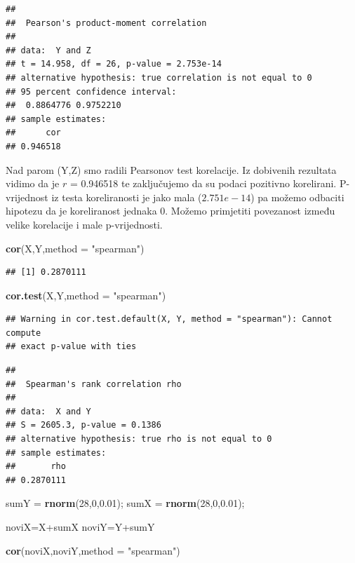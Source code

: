 \documentclass[]{article}
\newenvironment{Shaded}{\begin{snugshade}}{\end{snugshade}}
\newcommand{\KeywordTok}[1]{\textcolor[rgb]{0.13,0.29,0.53}{\textbf{{#1}}}}
\newcommand{\DataTypeTok}[1]{\textcolor[rgb]{0.13,0.29,0.53}{{#1}}}
\newcommand{\DecValTok}[1]{\textcolor[rgb]{0.00,0.00,0.81}{{#1}}}
\newcommand{\FloatTok}[1]{\textcolor[rgb]{0.00,0.00,0.81}{{#1}}}
\newcommand{\StringTok}[1]{\textcolor[rgb]{0.31,0.60,0.02}{{#1}}}
\newcommand{\NormalTok}[1]{{#1}}
\begin{document}
\begin{verbatim}
## 
##  Pearson's product-moment correlation
## 
## data:  Y and Z
## t = 14.958, df = 26, p-value = 2.753e-14
## alternative hypothesis: true correlation is not equal to 0
## 95 percent confidence interval:
##  0.8864776 0.9752210
## sample estimates:
##      cor 
## 0.946518
\end{verbatim}

Nad parom (Y,Z) smo radili Pearsonov test korelacije. Iz dobivenih
rezultata vidimo da je \(r\) = 0.946518 te zaključujemo da su podaci
pozitivno korelirani. P-vrijednost iz testa koreliranosti je jako mala
(\(2.751e-14\)) pa možemo odbaciti hipotezu da je koreliranost jednaka
0. Možemo primjetiti povezanost između velike korelacije i male
p-vrijednosti.

\begin{Shaded}
\begin{Highlighting}[]
\KeywordTok{cor}\NormalTok{(X,Y,}\DataTypeTok{method =} \StringTok{"spearman"}\NormalTok{)}
\end{Highlighting}
\end{Shaded}

\begin{verbatim}
## [1] 0.2870111
\end{verbatim}

\begin{Shaded}
\begin{Highlighting}[]
\KeywordTok{cor.test}\NormalTok{(X,Y,}\DataTypeTok{method =} \StringTok{"spearman"}\NormalTok{)}
\end{Highlighting}
\end{Shaded}

\begin{verbatim}
## Warning in cor.test.default(X, Y, method = "spearman"): Cannot compute
## exact p-value with ties
\end{verbatim}

\begin{verbatim}
## 
##  Spearman's rank correlation rho
## 
## data:  X and Y
## S = 2605.3, p-value = 0.1386
## alternative hypothesis: true rho is not equal to 0
## sample estimates:
##       rho 
## 0.2870111
\end{verbatim}

\begin{Shaded}
\begin{Highlighting}[]
\NormalTok{sumY =}\StringTok{ }\KeywordTok{rnorm}\NormalTok{(}\DecValTok{28}\NormalTok{,}\DecValTok{0}\NormalTok{,}\FloatTok{0.01}\NormalTok{);}
\NormalTok{sumX =}\StringTok{ }\KeywordTok{rnorm}\NormalTok{(}\DecValTok{28}\NormalTok{,}\DecValTok{0}\NormalTok{,}\FloatTok{0.01}\NormalTok{);}

\NormalTok{noviX=X+sumX}
\NormalTok{noviY=Y+sumY}

\KeywordTok{cor}\NormalTok{(noviX,noviY,}\DataTypeTok{method =} \StringTok{"spearman"}\NormalTok{)}
\end{Highlighting}
\end{Shaded}
\end{document}
